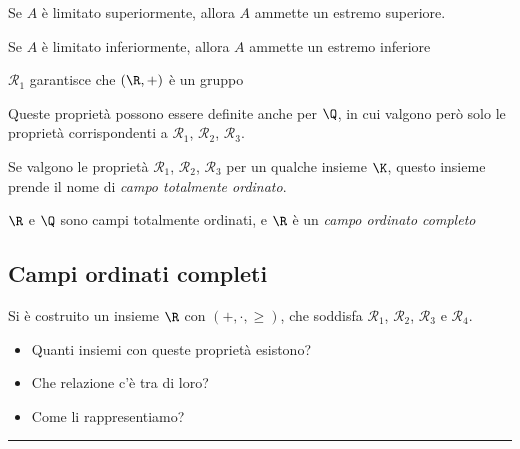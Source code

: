 \begin{itemize}
    Se $ A $ è limitato superiormente, allora $ A $ ammette un estremo superiore.
    
    Se $ A $ è limitato inferiormente, allora $ A $ ammette un estremo inferiore

\end{itemize}

$ \mathcal{R}_1 $ garantisce che $ (\R, +) $ è un gruppo

Queste proprietà possono essere definite anche per $ \Q $, in cui valgono però solo le proprietà corrispondenti a $ \mathcal{R}_1 $, $ \mathcal{R}_2 $, $ \mathcal{R}_3 $.

Se valgono le proprietà $ \mathcal{R}_1 $, $ \mathcal{R}_2 $, $ \mathcal{R}_3 $ per un qualche insieme $ \K $, questo insieme prende il nome di \textit{campo totalmente ordinato}.

$ \R $ e $ \Q $ sono campi totalmente ordinati, e $ \R $ è un \textit{campo ordinato completo}

\subsection{Campi ordinati completi}

Si è costruito un insieme $ \R $ con $ (+, \cdot, \ge) $, che soddisfa $ \mathcal{R}_1 $, $ \mathcal{R}_2 $, $ \mathcal{R}_3 $ e $ \mathcal{R}_4 $.
\begin{itemize}
    \item Quanti insiemi con queste proprietà esistono?
    \item Che relazione c'è tra di loro?
    \item Come li rappresentiamo?
\end{itemize}

\rule{7em}{.4pt}


